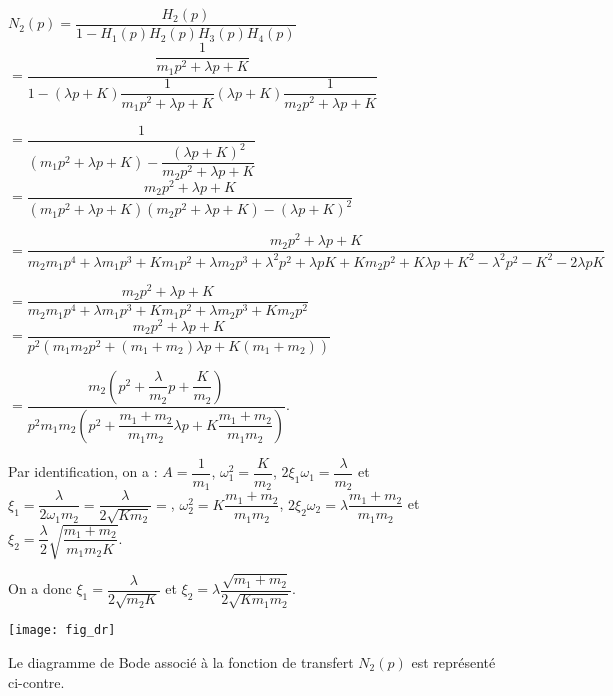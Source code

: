 \ifprof
\begin{corrige}
$N_2(p)=\dfrac{H_2(p)}{1-H_1(p)H_2(p) H_3(p)H_4(p)}$ 
$= \dfrac{\dfrac{1}{m_1p^2  + \lambda p+K}}{1-\left(\lambda p+K\right)\dfrac{1}{m_1p^2  + \lambda p+K} \left(\lambda p+K\right)\dfrac{1}{m_2p^2  + \lambda p+K}}$

$= \dfrac{1}{\left(m_1p^2  + \lambda p+K\right)- \dfrac{\left(\lambda p+K\right)^2}{m_2p^2  + \lambda p+K}}$
$= \dfrac{m_2p^2  + \lambda p+K}{\left(m_1p^2  + \lambda p+K\right)\left(m_2p^2  + \lambda p+K\right)- \left(\lambda p+K\right)^2}$

$= \dfrac{m_2p^2  + \lambda p+K}{
m_2m_1p^4  + \lambda m_1p^3+Km_1p^2+\lambda m_2p^3  + \lambda^2 p^2 +\lambda pK+Km_2p^2  + K\lambda p+K^2 - \lambda^2 p^2 -K^2 - 2\lambda p K}$

$= \dfrac{m_2p^2  + \lambda p+K}{
m_2m_1p^4  + \lambda m_1p^3+Km_1p^2+\lambda m_2p^3   +Km_2p^2 }$
$= \dfrac{m_2p^2  + \lambda p+K}{
p^2\left( m_1m_2p^2  + \left(m_1+ m_2\right) \lambda p  +K\left(m_1+m_2\right)\right) }$

$= \dfrac{m_2\left(p^2  + \dfrac{\lambda}{m_2}p+\dfrac{K}{m_2}\right)}{
p^2 m_1m_2 \left(p^2  + \dfrac{m_1+ m_2}{m_1m_2} \lambda p  +K\dfrac{m_1+m_2}{m_1m_2}\right) }$.

Par identification, on a : $A=\dfrac{1}{m_1}$, $\omega_1^2=\dfrac{K}{m_2}$, $2\xi_1\omega_1=\dfrac{\lambda}{m_2}$ et $\xi_1 = \dfrac{\lambda}{2 \omega_1 m_2}=\dfrac{\lambda}{2 \sqrt{Km_2}  } = $, $\omega_2^2=K\dfrac{m_1+m_2}{m_1m_2}$, $2\xi_2\omega_2=\lambda\dfrac{m_1+ m_2}{m_1m_2}$ et $\xi_2 = \dfrac{\lambda}{2}\sqrt{\dfrac{m_1+m_2}{m_1m_2 K}}$. 

On a donc $\xi_1=\dfrac{\lambda}{2  \sqrt{m_2K}}$ et 
$\xi_2=\lambda\dfrac{\sqrt{m_1+ m_2}}{2\sqrt{Km_1m_2}}$.

\end{corrige}
\else
\fi

\ifprof
\else


\begin{marginfigure}
\centering
\texttt{[image: fig\_dr]}
\end{marginfigure}
\fi
Le diagramme de Bode associé à la fonction de transfert $N_2(p)$ est représenté ci-contre.




